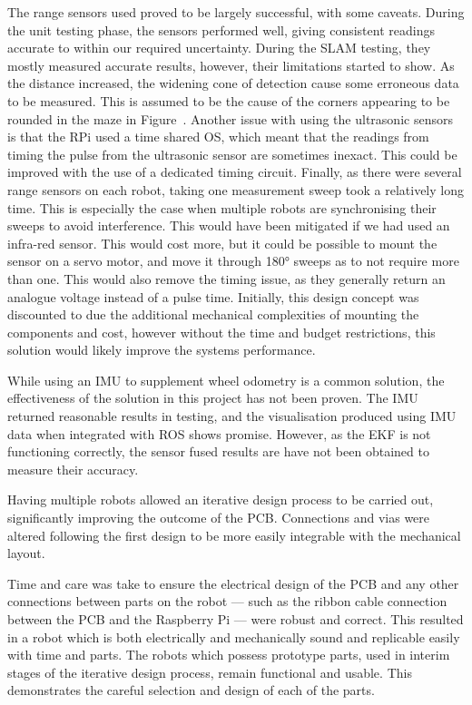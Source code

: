 The range sensors used proved to be largely successful, with some caveats. 
During the unit testing phase, the sensors performed well, giving consistent 
readings accurate to within our required uncertainty. During the SLAM testing, 
they mostly measured accurate results, however, their limitations started to 
show. As the distance increased, the widening cone of detection cause some 
erroneous data to be measured. This is assumed to be the cause of the corners 
appearing to be rounded in the maze in Figure~. 
Another issue with using the ultrasonic sensors is that the RPi used a time 
shared OS, which meant that the readings from timing the pulse from the 
ultrasonic sensor are sometimes inexact. This could be improved with the use of 
a dedicated timing circuit. Finally, as there were several range sensors on each 
robot, taking one measurement sweep took a relatively long time. This is 
especially the case when multiple robots are synchronising their sweeps to avoid 
interference. This would have been mitigated if we had used an infra-red sensor. 
This would cost more, but it could be possible to mount the sensor on a servo 
motor, and move it through \ang{180} sweeps as to not require more than one. 
This would also remove the timing issue, as they generally return an analogue 
voltage instead of a pulse time. Initially, this design concept was discounted 
to due the additional mechanical complexities of mounting the components and 
cost, however without the time and budget restrictions, this solution would 
likely improve the systems performance. 

While using an IMU to supplement wheel odometry is a common solution, the 
effectiveness of the solution in this project has not been proven. The IMU 
returned reasonable results in testing, and the visualisation produced using 
IMU data when integrated with ROS shows promise. However, as the EKF is not 
functioning correctly, the sensor fused results are have not been obtained to 
measure their accuracy. 

Having multiple robots allowed an 
iterative design process to be carried out, significantly improving the outcome 
of the PCB. Connections and vias were altered following the first design to be 
more easily integrable with the mechanical layout. 

Time and care was take to ensure the electrical design of the PCB and any other 
connections between parts on the robot --- such as the ribbon cable connection 
between the PCB and the Raspberry Pi --- were robust and correct. This resulted 
in a robot which is both electrically and mechanically sound and replicable 
easily with time and parts. The robots which possess prototype parts, used in 
interim stages of the iterative design process, remain functional and usable. 
This demonstrates the careful selection and design of each of the parts. 

